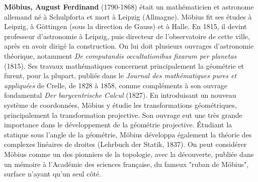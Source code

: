 \textbf{Möbius, August Ferdinand} (1790-1868) était un mathématicien et astronome allemand né à Schulpforta et mort à Leipzig (Allmagne). Möbius fit ses études à Leipzig, à Göttingen (sous la direction de Gauss) et à Halle. En 1815, il devint professeur d'astronomie à Leipzig, puis directeur de l'observatoire de cette ville, après en avoir dirigé la construction. On lui doit plusieurs ouvrages d'astronomie théorique, notamment \textit{De computandis occultationibus fixarum per planetas} (1815). Ses travaux mathématiques concernent principalement la géométrie et furent, pour la plupart, publiés dans le \textit{Journal des mathématiques pures et appliquées} de Crelle, de 1828 à 1858, comme compléments à son ouvrage fondamental \textit{Der barycentrische Calcul} (1827). En introduisant un nouveau système de coordonnées, Möbius y étudie les transformations géométriques, principalement la transformation projective. Son ouvrage eut une très grande importance dans le développement de la géométrie projective. Étudiant la statique sous l'angle de la géométrie, Möbius développa également la théorie des complexes linéaires de droites (Lehrbuch der Statik, 1837). On peut considérer Möbius comme un des pionniers de la topologie, avec la découverte, publiée dans un mémoire à l'Académie des sciences française, du fameux "ruban de Möbius", surface n'ayant qu'un seul côté.

